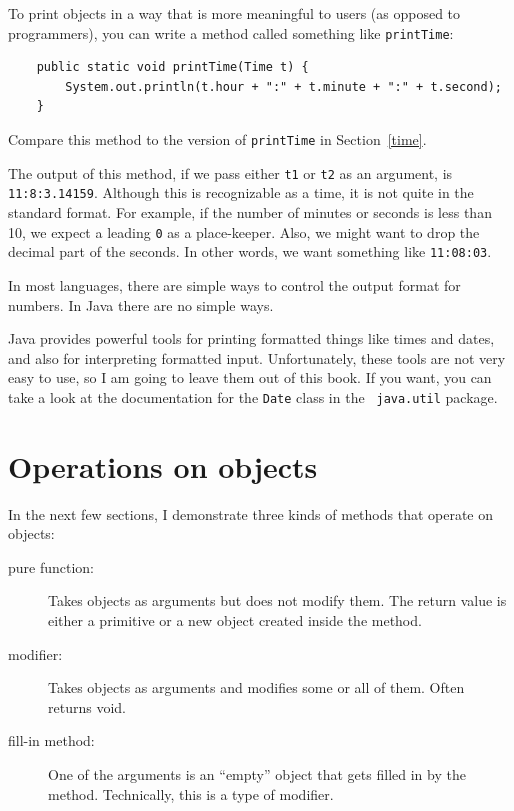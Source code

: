 To print objects in a way that is more meaningful to users
(as opposed to programmers), you can write a method
called something like {\tt printTime}:

\begin{lstlisting}
    public static void printTime(Time t) {
        System.out.println(t.hour + ":" + t.minute + ":" + t.second);
    }
\end{lstlisting}
%
Compare this method to the version of {\tt printTime} in
Section~\ref{time}.

The output of this method, if we pass either {\tt t1} or {\tt t2} as
an argument, is {\tt 11:8:3.14159}.  Although this is recognizable
as a time, it is not quite in the standard format.  For example, if
the number of minutes or seconds is less than 10, we expect a leading
{\tt 0} as a place-keeper.  Also, we might want to drop the decimal
part of the seconds.  In other words, we want something like
{\tt 11:08:03}.

In most languages, there are simple ways to control the output format
for numbers.  In Java there are no simple ways.

Java provides powerful tools for printing formatted things
like times and dates, and also for interpreting formatted input.
Unfortunately, these tools are not very easy to use, so I am going to
leave them out of this book.  If you want, you can take a look
at the documentation for the {\tt Date} class in the {\tt
java.util} package.


\section{Operations on objects}
\label{objectops}

In the next few
sections, I demonstrate three kinds of methods that
operate on objects:

\begin{description}

\item[pure function:]  Takes objects as
arguments but does not modify them.  The return value is
either a primitive or a new object created inside the method.

\item[modifier:]  Takes objects as arguments and modifies some
or all of them.  Often returns void. 

\item[fill-in method:]  One of the arguments is an ``empty''
object that gets filled in by the method.  Technically, this is
a type of modifier.

\end{description}

